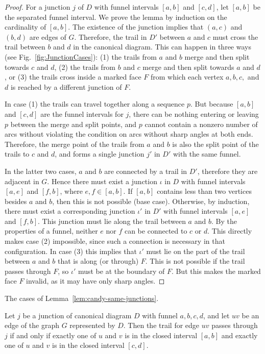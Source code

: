 \documentclass{llncs}
\begin{document}
\begin{proof}
For a junction $j$ of $D$ with funnel intervals $[a,b]$ and $[c,d]$, let $[a,b]$ be the separated funnel interval. We prove the lemma by induction on the cardinality of $[a,b]$. The existence of the junction implies that $(a, c)$ and $(b, d)$ are edges of $G$. Therefore, the trail in $D'$ between $a$ and $c$ must cross the trail between $b$ and $d$ in the canonical diagram. This can happen in three ways (see Fig.~\ref{fig:JunctionCases}): (1) the trails from $a$ and $b$ merge and then split towards $c$ and $d$, (2) the trails from $b$ and $c$ merge and then split towards $a$ and $d$, or (3) the trails cross inside a marked face $F$ from which each vertex $a,b,c,$ and $d$ is reached by a different junction of $F$.

In case (1) the trails can travel together along a sequence $p$. But because $[a,b]$ and $[c,d]$ are the funnel intervals for $j$, there can be nothing entering or leaving $p$ between the merge and split points, and $p$ cannot contain a nonzero number of arcs without violating the condition on arcs without sharp angles at both ends. Therefore, the merge point of the trails from $a$ and $b$ is also the split point of the trails to $c$ and $d$, and forms a single junction $j'$ in $D'$ with the same funnel.

In the latter two cases, $a$ and $b$ are connected by a trail in $D'$, therefore they are adjacent in $G$.
Hence there must exist a junction $\iota$ in $D$ with funnel intervals $[a,e]$ and $[f,b]$, where $e, f \in [a,b]$. If $[a,b]$ contains less than two vertices besides $a$ and $b$, then this is not possible (base case). Otherwise, by induction, there must exist a corresponding junction $\iota'$ in $D'$ with funnel intervals $[a,e]$ and $[f,b]$.
This junction must lie along the trail between $a$ and $b$. By the properties of a funnel, neither $e$ nor $f$ can be connected to $c$ or $d$. This directly makes case (2) impossible, since such a connection is necessary in that configuration. In case (3) this implies that $\iota'$ must lie on the part of the trail between $a$ and $b$ that is along (or through) $F$. This is not possible if the trail passes through $F$, so $\iota'$ must be at the boundary of $F$. But this makes the marked face $F$ invalid, as it may have only sharp angles.
\end{proof}

 {The cases of Lemma~\ref{lem:candy-same-junctions}.}

\begin{lemma}
\label{lem:trail-thru-junction}
Let $j$ be a junction of canonical diagram $D$ with funnel $a,b,c,d$, and let $uv$ be an
edge of the graph $G$ represented by $D$. Then the trail for edge $uv$ passes through $j$ if and only if
exactly one of $u$ and $v$ is in the closed interval $[a,b]$ and exactly one
of $u$ and $v$ is in the closed interval $[c,d]$.
\end{lemma}
\end{document}
